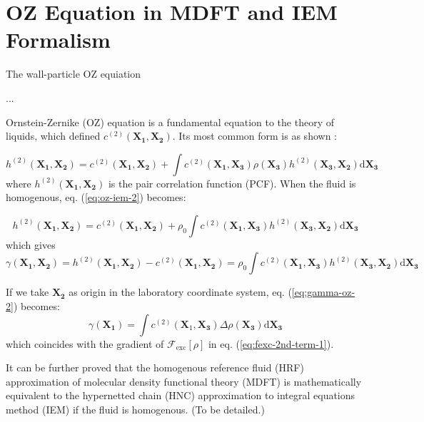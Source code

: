 \section{OZ Equation in MDFT and IEM Formalism}

The wall-particle OZ equiation

...

Ornstein-Zernike (OZ) equation is a fundamental equation to the theory
of liquids, which defined $c^{(2)}(\mathbf{X_{1}},\mathbf{X_{2}})$.
Its most common form is as shown \citep{Hensen-McDonald}:

\begin{equation}
h^{(2)}(\mathbf{X_{1}},\mathbf{X_{2}})=c^{(2)}(\mathbf{X_{1}},\mathbf{X_{2}})+\int c^{(2)}(\mathbf{X_{1}},\mathbf{X_{3}})\rho(\mathbf{X_{3}})h^{(2)}(\mathbf{X_{3}},\mathbf{X_{2}})\mathrm{d}\mathbf{X_{3}}\label{eq:oz-iem-2}
\end{equation}
where $h^{(2)}(\mathbf{X_{1}},\mathbf{X_{2}})$ is the pair correlation
function (PCF). When the fluid is homogenous, eq. (\ref{eq:oz-iem-2})
becomes:

\begin{equation}
h^{(2)}(\mathbf{X_{1}},\mathbf{X_{2}})=c^{(2)}(\mathbf{X_{1}},\mathbf{X_{2}})+\rho_{0}\int c^{(2)}(\mathbf{X_{1}},\mathbf{X_{3}})h^{(2)}(\mathbf{X_{3}},\mathbf{X_{2}})\mathrm{d}\mathbf{X_{3}}\label{eq:oz-iem-1-1}
\end{equation}
which gives 
\begin{equation}
\gamma(\mathbf{X_{1}},\mathbf{X_{2}})=h^{(2)}(\mathbf{X_{1}},\mathbf{X_{2}})-c^{(2)}(\mathbf{X_{1}},\mathbf{X_{2}})=\rho_{0}\int c^{(2)}(\mathbf{X_{1}},\mathbf{X_{3}})h^{(2)}(\mathbf{X_{3}},\mathbf{X_{2}})\mathrm{d}\mathbf{X_{3}}\label{eq:gamma-oz-2}
\end{equation}


If we take $\mathbf{X_{2}}$ as origin in the laboratory coordinate
system, eq. (\ref{eq:gamma-oz-2}) becomes:
\begin{equation}
\gamma(\mathbf{X_{1}})=\int c^{(2)}(\mathbf{X}_{1},\mathbf{X_{3}})\Delta\rho(\mathbf{X_{3}})\mathrm{d}\mathbf{X_{3}}\label{eq:gamma-oz-1-1}
\end{equation}
which coincides with the gradient of $\mathcal{F}_{\mathrm{exc}}\left[\rho\right]$
in eq. (\ref{eq:fexc-2nd-term-1}).

It can be further proved that the homogenous reference fluid (HRF)
approximation of molecular density functional theory (MDFT) is mathematically
equivalent to the hypernetted chain (HNC) approximation to integral
equations method (IEM) if the fluid is homogenous. (To be detailed.)


